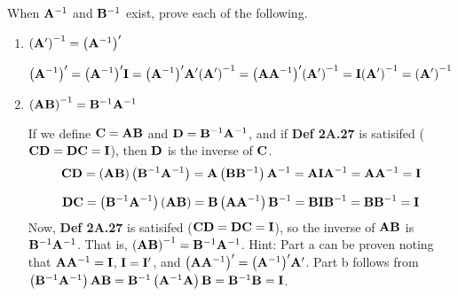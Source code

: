         When $\bold{A}^{-1}$ and $\bold{B}^{-1}$ exist, prove each of the following.
        \begin{enumerate}[label=(\alph*)]
            \item ${\left(\bold{A}^\prime\right)}^{-1} = {\left(\bold{A}^{-1}\right)}^\prime$
            
            \[
                {\left(\bold{A}^{-1}\right)}^\prime = {\left(\bold{A}^{-1}\right)}^\prime \bold{I} = {\left(\bold{A}^{-1}\right)}^\prime\bold{A}^\prime{\left(\bold{A}^\prime\right)}^{-1} =
                {\left(\bold{A}\bold{A}^{-1}\right)}^\prime{\left(\bold{A}^\prime\right)}^{-1} = \bold{I}{\left(\bold{A}^\prime\right)}^{-1} = {\left(\bold{A}^\prime\right)}^{-1}
            \]

            \item ${\left(\bold{A}\bold{B}\right)}^{-1} = \bold{B}^{-1} \bold{A}^{-1}$
            
            If we define $\bold{C} = \bold{A}\bold{B}$ and $\bold{D} = \bold{B}^{-1}\bold{A}^{-1}$, and if \textbf{Def 2A.27} is satisifed ($\bold{C}\bold{D} = \bold{D}\bold{C} = \bold{I}$), then $\bold{D}$ is the inverse of $\bold{C}$.
            \[
                \bold{C}\bold{D} = \left(\bold{A}\bold{B}\right)\left({\bold{B}}^{-1}{\bold{A}}^{-1}\right) = \bold{A}\left(\bold{B}{\bold{B}}^{-1}\right){\bold{A}}^{-1} = \bold{A}\bold{I}{\bold{A}}^{-1} = \bold{A}{\bold{A}}^{-1} = \bold{I}
            \]

            \[
                \bold{D}\bold{C} = \left({\bold{B}}^{-1}{\bold{A}}^{-1}\right)\left(\bold{A}\bold{B}\right) = \bold{B}\left(\bold{A}{\bold{A}}^{-1}\right){\bold{B}}^{-1} = \bold{B}\bold{I}{\bold{B}}^{-1} = \bold{B}{\bold{B}}^{-1} = \bold{I}
            \]
            Now, \textbf{Def 2A.27} is satisifed ($\bold{C}\bold{D} = \bold{D}\bold{C} = \bold{I}$), so the inverse of $\bold{A}\bold{B}$ is $\bold{B}^{-1}\bold{A}^{-1}$. That is, ${\left(\bold{A}\bold{B}\right)}^{-1} = \bold{B}^{-1} \bold{A}^{-1}$.
            \newline
            \newline
            Hint: Part a can be proven noting that $\bold{A}\bold{A}^{-1} = \bold{I}$, $\bold{I} = \bold{I}^\prime$, and ${\left(\bold{A}\bold{A}^{-1}\right)}^\prime = {\left(\bold{A}^{-1}\right)}^\prime \bold{A}^\prime$. Part b follows from $\left(\bold{B}^{-1}\bold{A}^{-1}\right) \bold{AB} = \bold{B}^{-1}\left(\bold{A}^{-1}\bold{A}\right)\bold{B} = \bold{B}^{-1}\bold{B} = \bold{I}$.
        \end{enumerate}